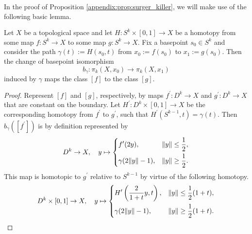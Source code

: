 \noindent In the proof of Proposition \ref{appendix:prop:surger_killer}, we will make use of the following basic lemma. 

\begin{lemma}
    \label{appendix:lem:change_of_basepoint_homotopy_lemma}
    Let $X$ be a topological space and let $H \colon S^k \times [0,1] \to X$ be a homotopy from some map $f \colon S^k \to X$ to some map $g \colon S^k \to X$. Fix a basepoint $s_0 \in S^k$ and consider the path $\gamma(t) := H(s_0,t)$ from $x_0 := f(s_0)$ to $x_1 := g(s_0)$. Then the change of basepoint isomorphism
    \[
    b_\gamma \colon \pi_k(X,x_0) \to \pi_k(X,x_1)
    \]
    induced by $\gamma$ maps the class $[f]$ to the class $[g]$.
\end{lemma}

\needspace{5cm}

\begin{proof}
    Represent $[f]$ and $[g]$, respectively, by maps $f^\prime \colon D^k \to X$ and $g^\prime \colon D^k \to X$ that are constant on the boundary. Let $H^\prime \colon D^k \times [0,1] \to X$ be the corresponding homotopy from $f^\prime$ to $g^\prime$, such that $H^\prime(S^{k-1},t) = \gamma(t)$. Then $b_\gamma([f^\prime])$ is by definition represented by 
    \[
    D^k \to X, \quad y \mapsto 
    \begin{dcases}
        f^\prime(2y), & \lVert y\rVert \leq \frac{1}{2},\\
        \gamma(2\lVert y\rVert-1), & \lVert y\rVert \geq \frac{1}{2}.
    \end{dcases}
    \] 
    This map is homotopic to $g^\prime$ relative to $S^{k-1}$ by virtue of the following homotopy. 
    \[
    D^k \times [0,1] \to X, \quad y \mapsto 
    \begin{dcases}
        H^\prime\left(\frac{2}{1+t}y,t\right), & \lVert y\rVert \leq \frac{1}{2}(1+t),\\
        \gamma(2\lVert y\rVert-1), & \lVert y\rVert \geq \frac{1}{2}(1+t).
    \end{dcases}
    \] 
\end{proof}

\needspace{5cm}

